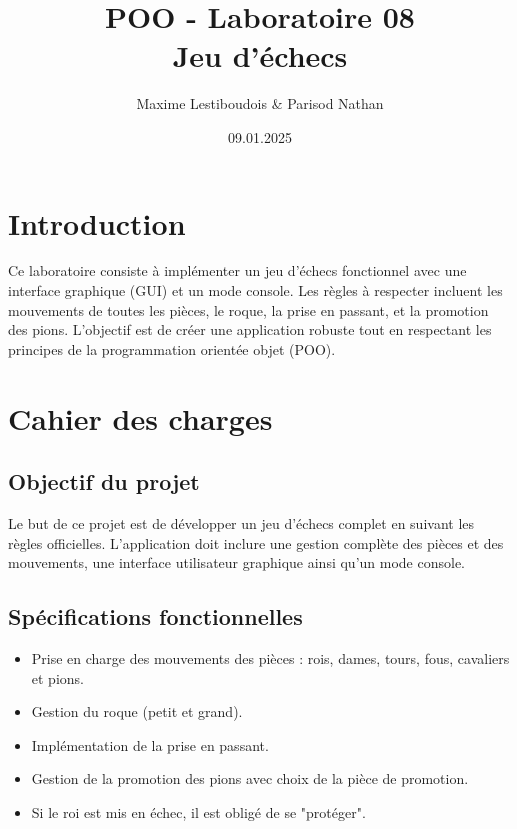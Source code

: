 \documentclass[12pt]{report}
\title{POO - Laboratoire 08 \\ \large Jeu d'échecs}
\author{Maxime Lestiboudois \& Parisod Nathan}
\date{09.01.2025}
\begin{document}
    \maketitle
    \tableofcontents
    \newpage


    \section*{Introduction}
    Ce laboratoire consiste à implémenter un jeu d'échecs fonctionnel avec une interface graphique (GUI) et un mode console. Les règles à respecter incluent les mouvements de toutes les pièces, le roque, la prise en passant, et la promotion des pions. L'objectif est de créer une application robuste tout en respectant les principes de la programmation orientée objet (POO).


    \section*{Cahier des charges}
    \subsection*{Objectif du projet}
    Le but de ce projet est de développer un jeu d'échecs complet en suivant les règles officielles. L'application doit inclure une gestion complète des pièces et des mouvements, une interface utilisateur graphique ainsi qu'un mode console.

    \subsection*{Spécifications fonctionnelles}
    \begin{itemize}
        \item Prise en charge des mouvements des pièces : rois, dames, tours, fous, cavaliers et pions.
        \item Gestion du roque (petit et grand).
        \item Implémentation de la prise en passant.
        \item Gestion de la promotion des pions avec choix de la pièce de promotion.
        \item Si le roi est mis en échec, il est obligé de se "protéger".
    \end{itemize}
\end{document}
